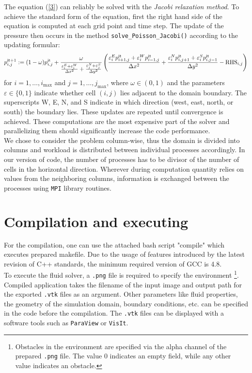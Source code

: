\documentclass[a4paper, 10pt]{article}
\begin{document}
The equation (\ref{3}) can reliably be solved with the \textit{Jacobi relaxation method}. To achieve the standard form of the equation, first the right hand side of the equation is computed at each grid point and time step. The update of the pressure then occurs in the method \texttt{solve\_Poisson\_Jacobi()} according to the updating formular:
\begin{equation*}
p_{i,j}^{\textnormal{it}+1} := (1-\omega)p_{i,j}^{\textnormal{it}} + \frac{\omega}{\frac{\varepsilon_i^E + \varepsilon_i^W}{\Delta x^2} + \frac{\varepsilon_j^N + \varepsilon_j^S}{\Delta y^2}} \left( \frac{\varepsilon_i^Ep_{i+1,j}^{\textmd{it}} + \varepsilon_i^Wp_{i-1,j}^{\textmd{it}}}{\Delta x^2}+\frac{\varepsilon_i^Np_{i,j + 1}^{\textmd{it}} + \varepsilon_i^Sp_{i, j-1}^{\textmd{it}}}{\Delta y^2} - \mathrm{RHS}_{i,j}\right)
\end{equation*}
for $ i = 1 , \dots, i_{\max} $ and $ j = 1, \dots, j_{\max} $, where $\omega\in(0, 1)$ and the parameters $ \varepsilon \in \{0, 1\} $ indicate whether cell $ (i, j) $ lies adjacent to the domain boundary. The superscripts
W, E, N, and S indicate in which direction (west, east, north, or south) the boundary lies. These updates are repeated until convergence is achieved. These computations are the most expensive part of the solver and parallelizing them should significantly increase the code performance.\\

We chose to consider the problem column-wise, thus the domain is divided into columns and workload is distributed between individual processes accordingly. In our version of code, the number of processes has to be divisor of the number of cells in the horizontal direction. Wherever during computation quantity relies on values from the neighboring columns, information is exchanged between the processes using \texttt{MPI} library routines.

\section{Compilation and executing}

For the compilation, one can use the attached bash script "compile" which executes prepared makefile. Due to the usage of features introduced by the latest revision of C++ standards, the minimum required version of GCC is 4.8.\\

To execute the fluid solver, a \texttt{.png} file is required to specify the environment \footnote{Obstacles in the environment are specified via the alpha channel of the prepared \texttt{.png} file. The value 0 indicates an empty field, while any other value indicates an obstacle.}. Compiled application takes the filename of the input image and output path for the exported \texttt{.vtk} files as an argument. Other parameters like fluid properties, the geometry of the simulation domain, boundary conditions, etc. can be specified in the code before the compilation. The  \texttt{.vtk} files can be displayed with a software tools such as \texttt{ParaView} or \texttt{VisIt}. \\
\end{document}
